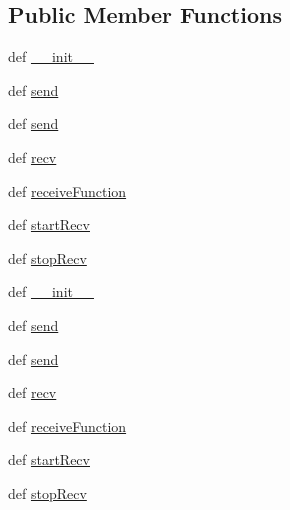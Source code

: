 \subsection*{Public Member Functions}
\begin{DoxyCompactItemize}
\item 
def \hyperlink{classnetwork_1_1NETWORK__CORE_1_1UDPChannel_a628f06fad9f7da98bbc9b5b6630271ea}{\+\_\+\+\_\+init\+\_\+\+\_\+}
\item 
def \hyperlink{classnetwork_1_1NETWORK__CORE_1_1UDPChannel_ada99dd7f7ad27fc1db37062daf953e1c}{send}
\item 
def \hyperlink{classnetwork_1_1NETWORK__CORE_1_1UDPChannel_ada99dd7f7ad27fc1db37062daf953e1c}{send}
\item 
def \hyperlink{classnetwork_1_1NETWORK__CORE_1_1UDPChannel_a3b4c88da7b885083e8aa44aef436e8e6}{recv}
\item 
def \hyperlink{classnetwork_1_1NETWORK__CORE_1_1UDPChannel_a6edcb5683390f03f4b72e0525bc4e1f7}{receive\+Function}
\item 
def \hyperlink{classnetwork_1_1NETWORK__CORE_1_1UDPChannel_a713bd6e7b9bbe515669fe8e23981be8d}{start\+Recv}
\item 
def \hyperlink{classnetwork_1_1NETWORK__CORE_1_1UDPChannel_aa5a9c175e34181c0aa2b49ad2f9b10f6}{stop\+Recv}
\item 
def \hyperlink{classnetwork_1_1NETWORK__CORE_1_1UDPChannel_a628f06fad9f7da98bbc9b5b6630271ea}{\+\_\+\+\_\+init\+\_\+\+\_\+}
\item 
def \hyperlink{classnetwork_1_1NETWORK__CORE_1_1UDPChannel_ada99dd7f7ad27fc1db37062daf953e1c}{send}
\item 
def \hyperlink{classnetwork_1_1NETWORK__CORE_1_1UDPChannel_ada99dd7f7ad27fc1db37062daf953e1c}{send}
\item 
def \hyperlink{classnetwork_1_1NETWORK__CORE_1_1UDPChannel_a3b4c88da7b885083e8aa44aef436e8e6}{recv}
\item 
def \hyperlink{classnetwork_1_1NETWORK__CORE_1_1UDPChannel_a6edcb5683390f03f4b72e0525bc4e1f7}{receive\+Function}
\item 
def \hyperlink{classnetwork_1_1NETWORK__CORE_1_1UDPChannel_a713bd6e7b9bbe515669fe8e23981be8d}{start\+Recv}
\item 
def \hyperlink{classnetwork_1_1NETWORK__CORE_1_1UDPChannel_aa5a9c175e34181c0aa2b49ad2f9b10f6}{stop\+Recv}
\end{DoxyCompactItemize}
